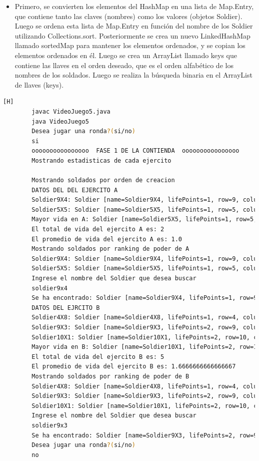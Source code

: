 \documentclass{article}
\begin{document}
	
	\begin{itemize}	
		\item Primero, se convierten los elementos del HashMap en una lista de Map.Entry, que contiene tanto las claves (nombres) como los valores (objetos Soldier). Luego se ordena esta lista de Map.Entry en función del nombre de los Soldier utilizando Collections.sort.
		Posteriormente se crea un nuevo LinkedHashMap llamado sortedMap para mantener los elementos ordenados, y se copian los elementos ordenados en él. Luego se crea un ArrayList llamado keys que contiene las llaves en el orden deseado, que es el orden alfabético de los nombres de los soldados. Luego se realiza la búsqueda binaria en el ArrayList de llaves (keys). 
	\end{itemize}
	
	
	
	
	\begin{lstlisting}[language=bash,caption={Compilando y probando }][H]
		javac VideoJuego5.java
		java VideoJuego5
		Desea jugar una ronda?(si/no)
		si
		oooooooooooooooo  FASE 1 DE LA CONTIENDA  oooooooooooooooo
		Mostrando estadisticas de cada ejercito
		
		Mostrando soldados por orden de creacion
		DATOS DEL DEL EJERCITO A
		Soldier9X4: Soldier [name=Soldier9X4, lifePoints=1, row=9, column=4]
		Soldier5X5: Soldier [name=Soldier5X5, lifePoints=1, row=5, column=5]
		Mayor vida en A: Soldier [name=Soldier5X5, lifePoints=1, row=5, column=5]
		El total de vida del ejercito A es: 2
		El promedio de vida del ejercito A es: 1.0
		Mostrando soldados por ranking de poder de A
		Soldier9X4: Soldier [name=Soldier9X4, lifePoints=1, row=9, column=4]
		Soldier5X5: Soldier [name=Soldier5X5, lifePoints=1, row=5, column=5]
		Ingrese el nombre del Soldier que desea buscar
		soldier9x4
		Se ha encontrado: Soldier [name=Soldier9X4, lifePoints=1, row=9, column=4]
		DATOS DEL EJRCITO B
		Soldier4X8: Soldier [name=Soldier4X8, lifePoints=1, row=4, column=8]
		Soldier9X3: Soldier [name=Soldier9X3, lifePoints=2, row=9, column=3]
		Soldier10X1: Soldier [name=Soldier10X1, lifePoints=2, row=10, column=1]
		Mayor vida en B: Soldier [name=Soldier10X1, lifePoints=2, row=10, column=1]
		El total de vida del ejercito B es: 5
		El promedio de vida del ejercito B es: 1.6666666666666667
		Mostrando soldados por ranking de poder de B
		Soldier4X8: Soldier [name=Soldier4X8, lifePoints=1, row=4, column=8]
		Soldier9X3: Soldier [name=Soldier9X3, lifePoints=2, row=9, column=3]
		Soldier10X1: Soldier [name=Soldier10X1, lifePoints=2, row=10, column=1]
		Ingrese el nombre del Soldier que desea buscar
		soldier9x3
		Se ha encontrado: Soldier [name=Soldier9X3, lifePoints=2, row=9, column=3]
		Desea jugar una ronda?(si/no)
		no
	\end{lstlisting}
	
\end{document}
